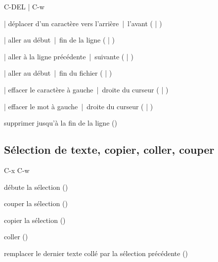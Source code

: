 \begin{ttscript}{C-DEL | C-w}
  \raggedright
\item[\code{C-b} | \code{C-f}] déplacer d'un caractère vers l'arrière~|~l'avant
  ( | )
\item[\code{C-a} | \code{C-e}] aller au début~|~fin de la ligne
  ( | )
\item[\code{C-p} | \code{C-n}] aller à la ligne précédente~|~suivante
  ( | )
\item[\code{M-<} | \code{M->}] aller au début~|~fin du fichier
  ( | ) \\[\baselineskip]
\item[\code{DEL} | \code{C-d}] effacer le caractère à
  gauche~|~droite du curseur ( | )
\item[\code{M-DEL} | \code{M-d}] effacer le mot à gauche~|~droite
  du curseur ( | )
\item[\code{C-k}] supprimer jusqu'à la fin de la ligne ()
\end{ttscript}



\subsection{Sélection de texte, copier, coller, couper}
\label{sec:emacs+ess:commandes:selection}

\begin{ttscript}{C-x C-w}
  \raggedright
\item[\code{C-SPC}] débute la sélection ()
\item[\code{C-w}] couper la sélection ()
\item[\code{M-w}] copier la sélection ()
\item[\code{C-y}] coller ()
\item[\code{M-y}] remplacer le dernier texte collé par la
  sélection précédente ()
\end{ttscript}

